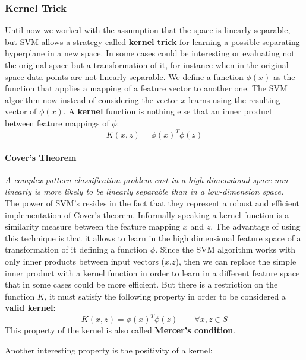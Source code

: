 

\subsubsection{Kernel Trick}
Until now we worked with the assumption that the space is linearly separable, but SVM allows a strategy called \textbf{kernel trick} for learning a possible separating hyperplane in a new space.
In some cases could be interesting or evaluating not the original space but a transformation of it, for instance when in the original space data points are not linearly separable. We define a function $\phi(x)$ as the function that applies a mapping of a feature vector to another one. The SVM algorithm now instead of considering the vector $x$ learns using the resulting vector of $\phi(x)$. A \textbf{kernel} function is nothing else that an inner product between feature mappings of $\phi$:
$$K(x,z) = \phi(x)^T\phi(z)$$

\paragraph{Cover's Theorem} \textit{A complex pattern-classification problem cast in a high-dimensional space non-linearly is more likely to be linearly separable than in a low-dimension space.}\\

The power of SVM's resides in the fact that they represent a robust and efficient implementation of Cover's theorem.
Informally speaking a kernel function is a similarity measure between the feature mapping $x$ and $z$.
The advantage of using this technique is that it allows to learn in the high dimensional feature space of a transformation of it defining a function $\phi$. 
Since the SVM algorithm works with only inner products between input vectors ($x$,$z$), then we can replace the simple inner product with a kernel function in order to learn in a different feature space that in some cases could be more efficient. But there is a restriction on the function $K$, it must satisfy the following property in order to be considered a \textbf{valid kernel}:
$$K(x,z) = \phi(x)^T\phi(z) \qquad \forall x, z \in S$$
This property of the kernel is also called \textbf{Mercer's condition}.

Another interesting property is the positivity of a kernel:
